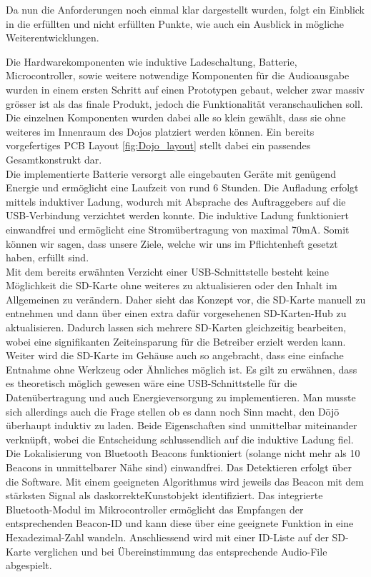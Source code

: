 Da nun die Anforderungen noch einmal klar dargestellt wurden, folgt ein Einblick in die erfüllten und nicht erfüllten Punkte, wie auch ein Ausblick in mögliche Weiterentwicklungen.
 
Die Hardwarekomponenten wie induktive Ladeschaltung, Batterie, Microcontroller, sowie weitere notwendige Komponenten für die Audioausgabe wurden in einem ersten Schritt auf einen Prototypen gebaut, welcher zwar massiv grösser ist als das finale Produkt, jedoch die Funktionalität veranschaulichen soll. Die einzelnen Komponenten wurden dabei alle so klein gewählt, dass sie ohne weiteres im Innenraum des Dojos platziert werden können. Ein bereits vorgefertiges PCB Layout \ref{fig:Dojo_layout} stellt dabei ein passendes Gesamtkonstrukt dar.\\

Die implementierte Batterie versorgt alle eingebauten Geräte mit genügend Energie und ermöglicht eine Laufzeit von rund 6 Stunden. Die Aufladung erfolgt mittels induktiver Ladung, wodurch mit Absprache des Auftraggebers auf die USB-Verbindung verzichtet werden konnte. Die induktive Ladung funktioniert einwandfrei und ermöglicht eine Stromübertragung von maximal 70mA. Somit können wir sagen, dass unsere Ziele, welche wir uns im Pflichtenheft gesetzt haben, erfüllt sind.\\

Mit dem bereits erwähnten Verzicht einer USB-Schnittstelle besteht keine Möglichkeit die SD-Karte ohne weiteres zu aktualisieren oder den Inhalt im Allgemeinen zu verändern. Daher sieht das Konzept vor, die SD-Karte manuell zu entnehmen und dann über einen extra dafür vorgesehenen SD-Karten-Hub zu aktualisieren. Dadurch lassen sich mehrere SD-Karten gleichzeitig bearbeiten, wobei eine signifikanten Zeiteinsparung für die Betreiber erzielt werden kann. Weiter wird die SD-Karte im Gehäuse auch so angebracht, dass eine einfache Entnahme ohne Werkzeug oder Ähnliches möglich ist.
Es gilt zu erwähnen, dass es theoretisch möglich gewesen wäre eine USB-Schnittstelle für die Datenübertragung und auch Energieversorgung zu implementieren. Man musste sich allerdings auch die Frage stellen ob es dann noch Sinn macht, den Dōjō überhaupt induktiv zu laden. Beide Eigenschaften sind unmittelbar miteinander verknüpft, wobei die Entscheidung schlussendlich auf die induktive Ladung fiel.\\

Die Lokalisierung von Bluetooth Beacons funktioniert (solange nicht mehr als 10 Beacons in unmittelbarer Nähe sind) einwandfrei. Das Detektieren erfolgt über die Software. Mit einem geeigneten Algorithmus wird jeweils das Beacon mit dem stärksten Signal als das\glqq korrekte\grqq Kunstobjekt identifiziert. Das integrierte Bluetooth-Modul im Mikrocontroller ermöglicht das Empfangen der entsprechenden Beacon-ID und kann diese über eine geeignete Funktion in eine Hexadezimal-Zahl wandeln. Anschliessend wird mit einer ID-Liste auf der SD-Karte verglichen und bei Übereinstimmung das entsprechende Audio-File abgespielt.\\

